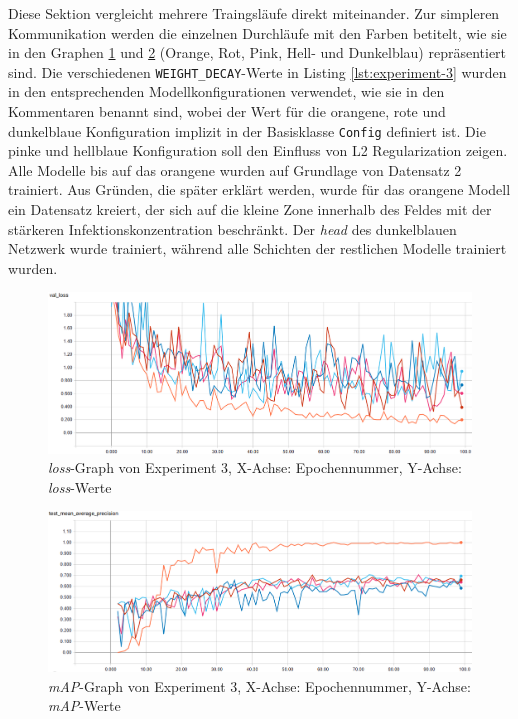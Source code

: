 \noindent
Diese Sektion vergleicht mehrere Traingsläufe direkt miteinander. Zur simpleren Kommunikation werden die einzelnen Durchläufe mit den Farben betitelt, wie sie in den Graphen \ref{fig:val-loss-3} und \ref{fig:map-3} (Orange, Rot, Pink, Hell- und Dunkelblau) repräsentiert sind. Die verschiedenen \texttt{WEIGHT\_DECAY}-Werte in Listing \ref{lst:experiment-3} wurden in den entsprechenden Modellkonfigurationen verwendet, wie sie in den Kommentaren benannt sind, wobei der Wert für die orangene, rote und dunkelblaue Konfiguration implizit in der Basisklasse \texttt{Config} definiert ist. Die pinke und hellblaue Konfiguration soll den Einfluss von L2 Regularization zeigen. Alle Modelle bis auf das orangene wurden auf Grundlage von Datensatz 2 trainiert. Aus Gründen, die später erklärt werden, wurde für das orangene Modell ein Datensatz kreiert, der sich auf die kleine Zone innerhalb des Feldes mit der stärkeren Infektionskonzentration beschränkt. Der \textit{head} des dunkelblauen Netzwerk wurde trainiert, während alle Schichten der restlichen Modelle trainiert wurden.

\begin{figure}[ht]
	\centering
    \includegraphics[width=.7\textwidth]{pics/val-loss-3.PNG}
    \caption[\textit{loss}-Graph von Experiment 3]{\textit{loss}-Graph von Experiment 3, X-Achse: Epochennummer, Y-Achse: \textit{loss}-Werte}
    \label{fig:val-loss-3}
\end{figure}

\begin{figure}[ht]
	\centering
    \includegraphics[width=.7\textwidth]{pics/map-3.PNG}
    \caption[\textit{mAP}-Graph von Experiment 3]{\textit{mAP}-Graph von Experiment 3, X-Achse: Epochennummer, Y-Achse: \textit{mAP}-Werte}
    \label{fig:map-3}
\end{figure}

